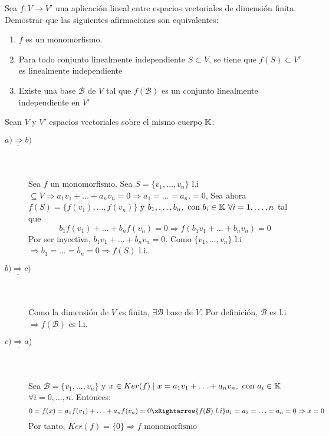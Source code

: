 \documentclass[12pt]{article}
\begin{document}
\begin{ejercicio}[3 puntos] Sea $f: V \rightarrow V'$ una aplicación lineal entre espacios vectoriales de dimensión finita. Demostrar que las siguientes afirmaciones son equivalentes:
    \begin{enumerate}[label=\alph*.]
    \item $f$ es un monomorfismo.
    \item Para todo conjunto linealmente independiente $S \subset V$, se tiene que $f(S) \subset V'$ es linealmente independiente
    \item Existe una base $\mathcal{B}$ de $V$ tal que $f(\mathcal{B})$ es un conjunto linealmente independiente en $V'$ 
    \end{enumerate}
        
        \noindent
        Sean $V$ y $V'$ espacios vectoriales sobre el mismo cuerpo ${\mathbb{K}}$:
        \begin{description}
            \item[$\underline{a) \Rightarrow b)}$] \ \\\\
            Sea $f$ un monomorfismo. Sea $S = \{v_1,\dotsc, v_n\}$ l.i $\subseteq V\Rightarrow a_1v_1 + \dotsc + a_nv_n = 0 \Rightarrow a_1 = \dotsc = a_n. = 0$, Sea ahora  $f(S) = \{f(v_1), \dotsc, f(v_n)\}$ y $b_1,\dotsc,b_n, \text{ con } b_i \in \K \ \forall i = 1,\dotsc,n$ tal que
            \begin{equation*}
                b_1f(v_1) + \dotsc + b_nf(v_n) = 0 \Rightarrow f(b_1v_1 + \dotsc + b_nv_n) = 0
            \end{equation*}
            Por ser inyectiva, $b_1v_1+ \dotsc + b_nv_n = 0$. Como $\{v_1,\dotsc,v_n\}$ l.i $\Rightarrow b_1 = \dotsc = b_n = 0 \Rightarrow f(S)$ l.i.
            \item[$\underline{b) \Rightarrow c)}$] \ \\\\
            Como la dimensión de $V$ es finita, $\exists \mathcal{B}$ base de $V$. Por definición, $\mathcal{B}$ es l.i $\Rightarrow f(\mathcal{B})$ es l.i.

            \item[$\underline{c) \Rightarrow a)}$] \ \\\\
            Sea $\mathcal{B} = \{v_1,\dotsc,v_n\}$ y $x \in Ker(f) \mid x = a_1v_1+\dotsc+a_nv_n, \text{ con } a_i \in {\mathbb{K}}$ $\forall i = 0,\dotsc,n$. Entonces:
            \begin{equation*}
                0 = f(x) = a_1f(v_1)+\dotsc+a_nf(v_n) = 0 \xRightarrow{f(\mathcal{B}) \ l.i} a_1 = a_2 = \dotsc = a_n= 0 \Rightarrow x = 0
            \end{equation*}
            Por tanto, $Ker(f) = \{0\} \Rightarrow f \text{ monomorfismo }$
        \end{description}
    \end{ejercicio}
    
\end{document}
